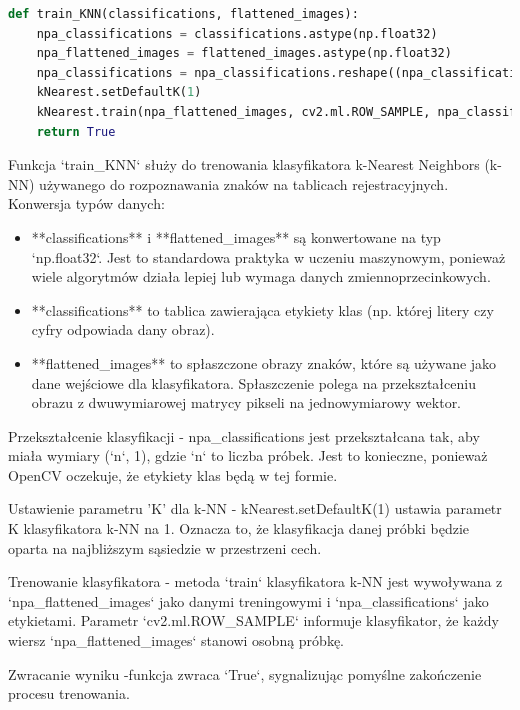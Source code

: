 \documentclass[12pt,a4paper,oneside]{article}
\theoremstyle{definition}
\numberwithin{equation}{section}
\begin{document}
\begin{lstlisting}[language=Python]
def train_KNN(classifications, flattened_images):
    npa_classifications = classifications.astype(np.float32)
    npa_flattened_images = flattened_images.astype(np.float32)
    npa_classifications = npa_classifications.reshape((npa_classifications.size, 1))
    kNearest.setDefaultK(1)
    kNearest.train(npa_flattened_images, cv2.ml.ROW_SAMPLE, npa_classifications)
    return True
\end{lstlisting} 



Funkcja `train\_KNN` służy do trenowania klasyfikatora k-Nearest Neighbors (k-NN) używanego do rozpoznawania znaków na tablicach rejestracyjnych. 
Konwersja typów danych:
\begin{itemize}
  \item **classifications** i **flattened\_images** są konwertowane na typ `np.float32`. Jest to standardowa praktyka w uczeniu maszynowym, ponieważ wiele algorytmów działa lepiej lub wymaga danych zmiennoprzecinkowych.
  \item **classifications** to tablica zawierająca etykiety klas (np. której litery czy cyfry odpowiada dany obraz).
  \item **flattened\_images** to spłaszczone obrazy znaków, które są używane jako dane wejściowe dla klasyfikatora. Spłaszczenie polega na przekształceniu obrazu z dwuwymiarowej matrycy pikseli na jednowymiarowy wektor.
\end{itemize}





Przekształcenie klasyfikacji - npa\_classifications jest przekształcana tak, aby miała wymiary (`n`, 1), gdzie `n` to liczba próbek. Jest to konieczne, ponieważ OpenCV oczekuje, że etykiety klas będą w tej formie.

Ustawienie parametru 'K' dla k-NN - kNearest.setDefaultK(1) ustawia parametr K klasyfikatora k-NN na 1. Oznacza to, że klasyfikacja danej próbki będzie oparta na najbliższym sąsiedzie w przestrzeni cech.

Trenowanie klasyfikatora - metoda `train` klasyfikatora k-NN jest wywoływana z `npa\_flattened\_images` jako danymi treningowymi i `npa\_classifications` jako etykietami. Parametr `cv2.ml.ROW\_SAMPLE` informuje klasyfikator, że każdy wiersz `npa\_flattened\_images` stanowi osobną próbkę.


Zwracanie wyniku -funkcja zwraca `True`, sygnalizując pomyślne zakończenie procesu trenowania.
\end{document}

